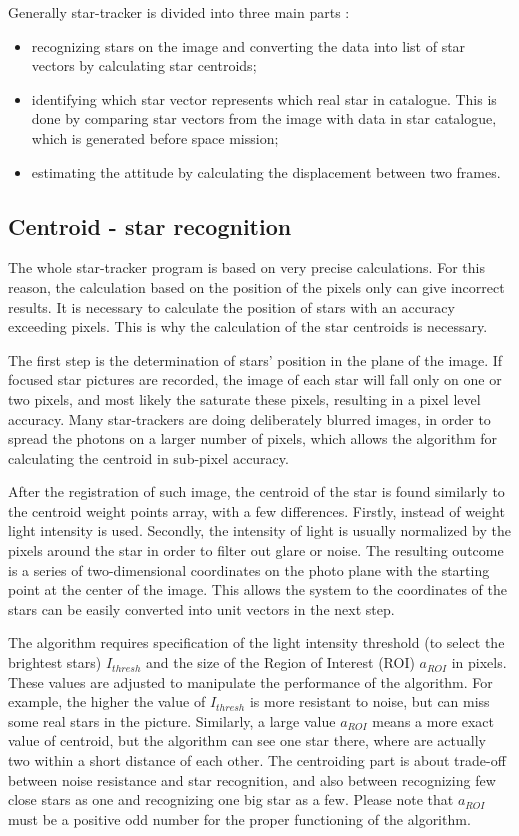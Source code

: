 \documentclass[12pt,a4paper,oneside]{article}
\begin{document}
Generally star-tracker is divided into three main parts \citet{mcbryde2012star}:
\begin{itemize}
\item recognizing stars on the image and converting the data into list of star vectors by calculating star centroids;
\item identifying which star vector represents which real star in catalogue. This is done by comparing star vectors from the image with data in star catalogue, which is generated before space mission;
\item estimating the attitude by calculating the displacement between two frames.
\end{itemize}

\subsection{Centroid - star recognition}

The whole star-tracker program is based on very precise calculations. For this reason, the calculation based on the position of the pixels only can give incorrect results. It is necessary to calculate the position of stars with an accuracy exceeding pixels. This is why the calculation of the star centroids is necessary.

The first step is the determination of stars' position in the plane of the image. If focused star pictures are recorded, the image of each star will fall only on one or two pixels, and most likely the saturate these pixels, resulting in a pixel level accuracy.
Many star-trackers are doing deliberately blurred images, in order to spread the photons on a larger number of pixels, which allows the algorithm for calculating the centroid in sub-pixel accuracy.

After the registration of such image, the centroid of the star is found similarly to the centroid weight points array, with a few differences. Firstly, instead of weight light intensity is used. Secondly, the intensity of light is usually normalized by the pixels around the star in order to filter out glare or noise. The resulting outcome is a series of two-dimensional coordinates on the photo plane with the starting point at the center of the image. This allows the system to the coordinates of the stars can be easily converted into unit vectors in the next step.

The algorithm requires specification of the light intensity threshold (to select the brightest stars) $I_{thresh}$ and the size of the Region of Interest (ROI) $a_{ROI}$ in pixels. These values are adjusted to manipulate the performance of the algorithm. For example, the higher the value of $I_{thresh}$ is more resistant to noise, but can miss some real stars in the picture. Similarly, a large value $a_{ROI}$ means a more exact value of centroid, but the algorithm can see one star there, where are actually two within a short distance of each other. The centroiding part is about trade-off between noise resistance and star recognition, and also between recognizing few close stars as one and recognizing one big star as a few.
Please note that $a_{ROI}$ must be a positive odd number for the proper functioning of the algorithm.
\end{document}
